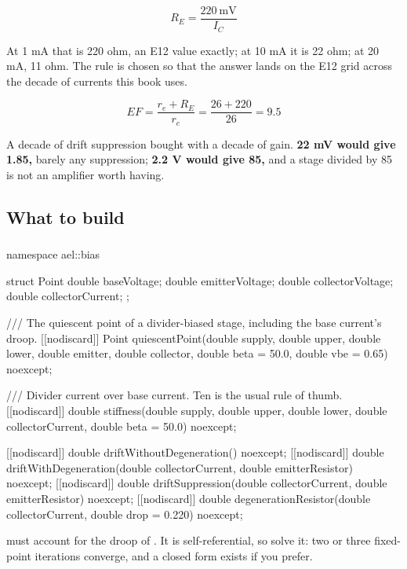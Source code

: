 \[
  R_E = \frac{220\ \text{mV}}{I_C}
\]

At 1 mA that is 220 ohm, an E12 value exactly; at 10 mA it is 22 ohm; at 20 mA, 11 ohm. The rule is chosen so that the answer lands on the E12 grid across the decade of currents this book uses.

\[
  EF = \frac{r_e + R_E}{r_e} = \frac{26 + 220}{26} = 9.5
\]

A decade of drift suppression bought with a decade of gain. \textbf{22 mV would give 1.85,} barely any suppression; \textbf{2.2 V would give 85,} and a stage divided by 85 is not an amplifier worth having.

\subsection{What to build}
\label{c6:sec:b5}

\subsubsection{}
\begin{cppcode}
namespace ael::bias
{
struct Point
{
    double baseVoltage{};
    double emitterVoltage{};
    double collectorVoltage{};
    double collectorCurrent{};
};

/// The quiescent point of a divider-biased stage, including the base current's droop.
[[nodiscard]] Point quiescentPoint(double supply, double upper, double lower, double emitter,
                                   double collector, double beta = 50.0, double vbe = 0.65) noexcept;

/// Divider current over base current. Ten is the usual rule of thumb.
[[nodiscard]] double stiffness(double supply, double upper, double lower,
                               double collectorCurrent, double beta = 50.0) noexcept;

[[nodiscard]] double driftWithoutDegeneration() noexcept;
[[nodiscard]] double driftWithDegeneration(double collectorCurrent, double emitterResistor) noexcept;
[[nodiscard]] double driftSuppression(double collectorCurrent, double emitterResistor) noexcept;
[[nodiscard]] double degenerationResistor(double collectorCurrent, double drop = 0.220) noexcept;
}
\end{cppcode}

 must account for the droop of . It is self-referential, so solve it: two or three fixed-point iterations converge, and a closed form exists if you prefer.

